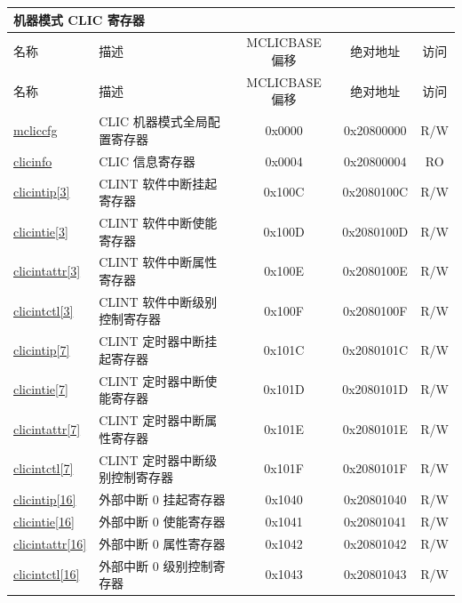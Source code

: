 \begin{longtable}{ | p{1.8cm} | p{7.5cm} | c | c | c | }
\hline
\multicolumn{5}{|l|}{\textbf{机器模式 CLIC 寄存器}} \\\hline
\hline\rowcolor{lightgray}
名称 & 描述 & MCLICBASE 偏移 & 绝对地址 & 访问 \\ \hline
\endfirsthead
\hline
\rowcolor{lightgray}
名称 & 描述 & MCLICBASE 偏移 & 绝对地址 & 访问 \\
\hline
\endhead
\endfoot
\hyperref[regdesc:MCLICCFG_REG]{mcliccfg} & CLIC 机器模式全局配置寄存器 & 0x0000 & 0x20800000 & R/W \\\hline
\hyperref[regdesc:CLICINFO_REG]{clicinfo} & CLIC 信息寄存器 & 0x0004 & 0x20800004 & RO \\\hline

\hyperref[regdesc:MCLICINTIP_REG_i]{clicintip[3]} & CLINT 软件中断挂起寄存器 & 0x100C & 0x2080100C & R/W \\\hline
\hyperref[regdesc:MCLICINTIE_REG_i]{clicintie[3]} & CLINT 软件中断使能寄存器 & 0x100D & 0x2080100D & R/W \\\hline
\hyperref[regdesc:MCLICINTATTR_REG_i]{clicintattr[3]} & CLINT 软件中断属性寄存器 & 0x100E & 0x2080100E & R/W \\\hline
\hyperref[regdesc:MCLICINTCTL_REG_i]{clicintctl[3]} & CLINT 软件中断级别控制寄存器 & 0x100F & 0x2080100F & R/W \\\hline

\hyperref[regdesc:MCLICINTIP_REG_i]{clicintip[7]} & CLINT 定时器中断挂起寄存器 & 0x101C & 0x2080101C & R/W \\\hline
\hyperref[regdesc:MCLICINTIE_REG_i]{clicintie[7]} & CLINT 定时器中断使能寄存器 & 0x101D & 0x2080101D & R/W \\\hline
\hyperref[regdesc:MCLICINTATTR_REG_i]{clicintattr[7]} & CLINT 定时器中断属性寄存器 & 0x101E & 0x2080101E & R/W \\\hline
\hyperref[regdesc:MCLICINTCTL_REG_i]{clicintctl[7]} & CLINT 定时器中断级别控制寄存器 & 0x101F & 0x2080101F & R/W \\\hline

\hyperref[regdesc:MCLICINTIP_REG_i]{clicintip[16]} & 外部中断 0 挂起寄存器 & 0x1040 & 0x20801040 & R/W \\\hline
\hyperref[regdesc:MCLICINTIE_REG_i]{clicintie[16]} & 外部中断 0 使能寄存器 & 0x1041 & 0x20801041 & R/W \\\hline
\hyperref[regdesc:MCLICINTATTR_REG_i]{clicintattr[16]} & 外部中断 0 属性寄存器 & 0x1042 & 0x20801042 & R/W \\\hline
\hyperref[regdesc:MCLICINTCTL_REG_i]{clicintctl[16]} & 外部中断 0 级别控制寄存器 & 0x1043 & 0x20801043 & R/W \\\hline


\end{longtable}
